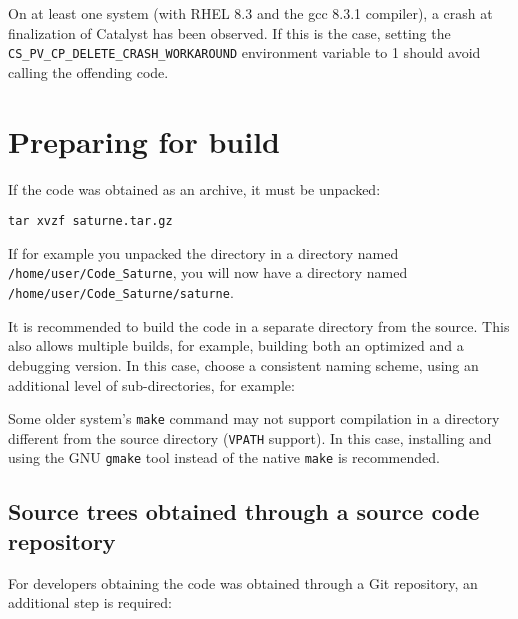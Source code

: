 \documentclass[a4paper,10pt,twoside]{csshortdoc}
\begin{document}
On at least one system (with RHEL 8.3 and the gcc 8.3.1 compiler),
a crash at finalization of Catalyst has been observed. If this is the case,
setting the \texttt{CS\_PV\_CP\_DELETE\_CRASH\_WORKAROUND} environment
variable to 1 should avoid calling the offending code.

\section{Preparing for build\label{sec:prepare}}

If the code was obtained as an archive, it must be unpacked:

\texttt{tar xvzf saturne.tar.gz}

If for example you unpacked the directory in a directory
named \texttt{/home/user/Code\_Saturne}, you will now
have a directory named \texttt{/home/user/Code\_Saturne/saturne}.

It is recommended to build the code in a separate directory from the source.
This also allows multiple builds, for example, building both an
optimized and a debugging version. In this case, choose a consistent
naming scheme, using an additional level of sub-directories,
for example:


Some older system's {\tt make} command may not support compilation
in a directory different from the source directory ({\tt VPATH}
support). In this case, installing and using the GNU {\tt gmake}
tool instead of the native {\tt make} is recommended.

\subsection{Source trees obtained through a source code repository\label{sec:preparerepo}}

For developers obtaining the code was obtained through a Git repository,
an additional step is required:

\end{document}
